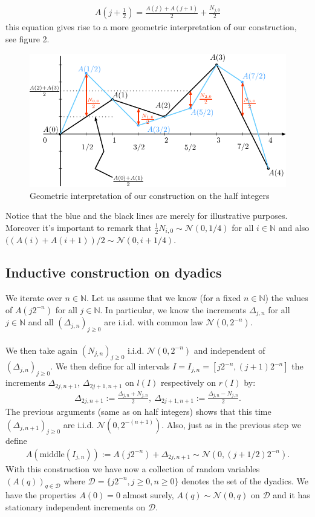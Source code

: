 \documentclass[../mainfile.tex]{subfiles}
\begin{document}
\begin{align*}
A \left( j + \frac{1}{2} \right) = \frac{A(j)+A(j+1)}{2} + \frac{N_{j,0}}{2}
\end{align*}
this equation gives rise to a more geometric interpretation of our construction, see figure 2. 
\newpage
\begin{figure}[hbtp]
\centering
\includegraphics[scale=1]{figure2.pdf}
\caption{Geometric interpretation of our construction on the half integers}
\end{figure}
Notice that the blue and the black lines are merely for illustrative purposes. Moreover it's important to remark that $\frac{1}{2}N_{i,0} \sim \mathcal{N}(0,1/4)$ for all $i \in \mathbb{N}$ and also $((A(i)+A(i+1))/2 \sim \mathcal{N}(0, i+ 1/4)$. 
\subsection{Inductive construction on dyadics}
We iterate over $n \in \mathbb{N}$. Let us assume that we know (for a fixed $n \in \mathbb{N}$) the values of $A(j2^{-n})$ for all $j \in \mathbb{N}$. In particular,  we know the increments $\Delta_{j,n}$ for all $j \in \mathbb{N}$ and all $(\Delta_{j,n})_{j \geq 0}$ are i.i.d. with common law $\mathcal{N}(0, 2^{-n})$. 
\\\\
We then take again $(N_{j,n})_{j \geq 0 }$ i.i.d. $\mathcal{N}(0, 2^{-n})$ and independent of $(\Delta_{j,n})_{j \geq 0 }$. We then define for all intervals $I=I_{j,n}=[j2^{-n},(j+1)2^{-n}]$ the increments $\Delta_{2j,n+1}$, $\Delta_{2j+1,n+1}$ on $l(I)$ respectively on $r(I)$ by:
\begin{align*}
\Delta_{2j,n+1}:= \frac{\Delta_{j,n}+N_{j,n}}{2}, \ \Delta_{2j+1,n+1} := \frac{\Delta_{j,n}-N_{j,n}}{2}.
\end{align*}
The previous arguments (same as on half integers) shows that this time $(\Delta_{j,n+1})_{j \geq 0}$ are i.i.d. $\mathcal{N}(0,2^{-(n+1)})$. Also, just as in the previous step we define
\begin{align*}
A( \text{middle}(I_{j,n})) := A(j2^{-n})+ \Delta_{2j,n+1} \sim \mathcal{N}(0, (j+1/2)2^{-n}). 
\end{align*}
With this construction we have now a collection of random variables $(A(q))_{q \in \mathcal{D}}$ where $\mathcal{D}=\{j2^{-n},j \geq 0, n \geq 0\}$ denotes the set of the dyadics. We have the properties $A(0)=0$ almost surely, $A(q) \sim \mathcal{N}(0,q)$ on $\mathcal{D}$ and it has stationary independent increments on $\mathcal{D}$. 
\newpage
\end{document}
